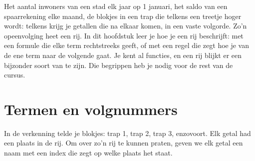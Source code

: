 %



Het aantal inwoners van een stad elk jaar op 1 januari, het saldo van een spaarrekening elke maand, de blokjes in een trap die telkens een treetje hoger wordt: telkens krijg je getallen die na elkaar komen, in een vaste volgorde. Zo'n opeenvolging heet een rij. In dit hoofdstuk leer je hoe je een rij beschrijft: met een formule die elke term rechtstreeks geeft, of met een regel die zegt hoe je van de ene term naar de volgende gaat. Je kent al functies, en een rij blijkt er een bijzonder soort van te zijn. Die begrippen heb je nodig voor de rest van de cursus.

\begin{oefeningen}[Start]

\end{oefeningen}


\section{Termen en volgnummers}

In de verkenning telde je blokjes: trap 1, trap 2, trap 3, enzovoort. Elk getal had een plaats in de rij. Om over zo'n rij te kunnen praten, geven we elk getal een naam met een index die zegt op welke plaats het staat.

